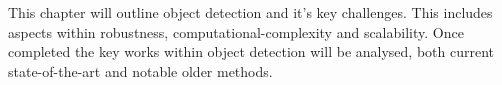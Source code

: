 This chapter will outline object detection and it's key challenges. This includes aspects within robustness, computational-complexity and scalability. Once completed the key works within object detection will be analysed, both current state-of-the-art and notable older methods.

